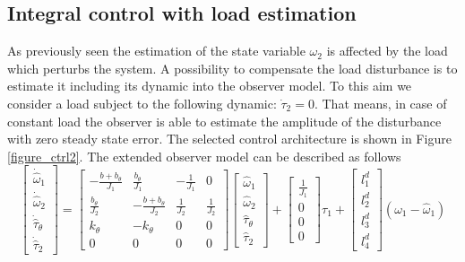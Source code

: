 \documentclass[11pt,a4paper,oneside]{book}
\numberwithin{equation}{section}
\theoremstyle{it}
\theoremstyle{definition}
\begin{document}
\subsection{Integral control with load estimation} 
As previously seen the estimation of the state variable $\omega_2$ is affected 
by the load which perturbs the system. A possibility to compensate the load 
disturbance is to estimate it including its dynamic into the observer model. To 
this aim we consider a load subject to the following dynamic: $\dot{\tau}_2=0$. 
That means, in case of constant load the observer is able to estimate the 
amplitude of the disturbance with zero steady state error. The selected control 
architecture is shown in Figure \ref{figure_ctrl2}.
The extended observer model can be described as follows
\begin{equation}\label{two_mass_obs_ext}
	\begin{bmatrix}
		\dot{\hat{\omega}}_1 \\[6pt]
		\dot{\hat{\omega}}_2 \\[6pt]
		\dot{\hat{\tau}}_{\theta} \\[6pt]
		\dot{\hat{\tau}}_2
	\end{bmatrix} = 
	\begin{bmatrix}
		-\frac{b+b_{\theta}}{J_1} & \frac{b_{\theta}}{J_1} & -\frac{1}{J_1} & 0 
		\\[6pt]
		\frac{b_{\theta}}{J_2} & -\frac{b+b_{\theta}}{J_2} & \frac{1}{J_2} & 
		\frac{1}{J_2}\\[6pt]
		k_{\theta} & -k_{\theta} & 0 & 0 \\[6pt]
		0 & 0 & 0 & 0
	\end{bmatrix}
	\begin{bmatrix}
		{\hat{\omega}_1} \\[6pt]
		{\hat{\omega}_2} \\[6pt]
		{\hat{\tau}}_{\theta} \\[6pt]
		{\hat{\tau}}_2
	\end{bmatrix} + 
	\begin{bmatrix}
		\frac{1}{J_1} \\[6pt]
		0 \\[6pt]
		0 \\[6pt]
		0
	\end{bmatrix} \tau_1+ 
	\begin{bmatrix}
		l_1^d\\[6pt]
		l_2^d \\[6pt]
		l_3^d \\[6pt]
		l_4^d
	\end{bmatrix} (\omega_1-\hat{\omega}_1)
\end{equation}
\end{document}

